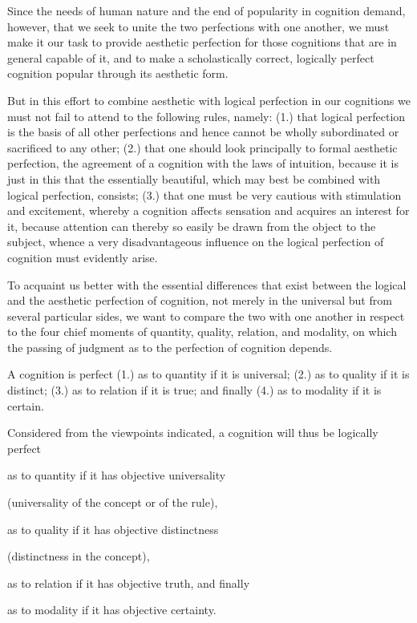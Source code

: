     Since the needs of human nature
    and the end of popularity in cognition
    demand, however, that we seek to unite
    the two perfections with one another,
    we must make it our task to provide
    aesthetic perfection for those cognitions
    that are in general capable of it,
    and to make a scholastically correct,
    logically perfect cognition
    popular through its aesthetic form.

But in this effort to combine aesthetic with logical perfection
in our cognitions we must not fail to attend to the following rules, namely:
(1.) that logical perfection is the basis of all other perfections and
hence cannot be wholly subordinated or sacrificed to any other;
(2.) that one should look principally to formal aesthetic perfection,
the agreement of a cognition with the laws of intuition,
because it is just in this that the essentially beautiful,
which may best be combined with logical perfection, consists;
(3.) that one must be very cautious with stimulation and excitement,
whereby a cognition affects sensation and acquires an interest for it,
because attention can thereby so easily be drawn
from the object to the subject,
whence a very disadvantageous influence on
the logical perfection of cognition must evidently arise.

To acquaint us better with the essential differences that exist between
the logical and the aesthetic perfection of cognition,
not merely in the universal but from several particular sides,
we want to compare the two with one another in respect to
the four chief moments of quantity, quality, relation, and modality,
on which the passing of judgment as to the perfection of cognition depends.

A cognition is perfect
(1.) as to quantity if it is universal;
(2.) as to quality if it is distinct;
(3.) as to relation if it is true; and finally
(4.) as to modality if it is certain.

Considered from the viewpoints indicated,
a cognition will thus be logically perfect

as to quantity if it has objective universality

    (universality of the concept or of the rule),

as to quality if it has objective distinctness

    (distinctness in the concept),

as to relation if it has objective truth, and finally

as to modality if it has objective certainty.


